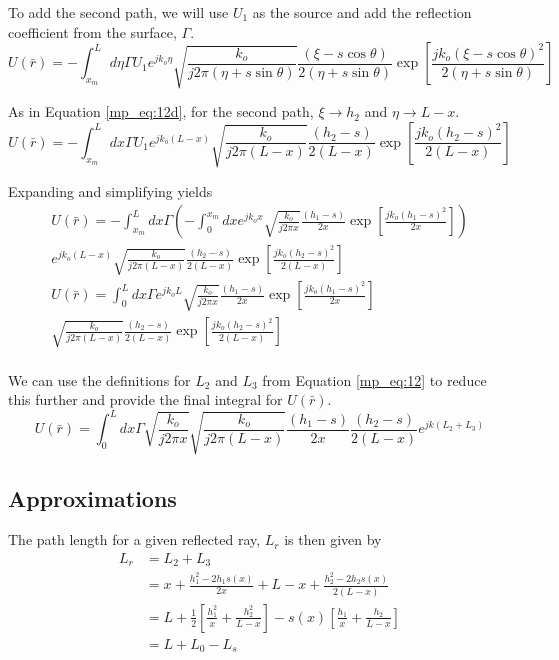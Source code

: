 To add the second path, we will use $U_1$ as the source and add the reflection coefficient from the surface, $\Gamma$.
\begin{equation}
U(\bar{r}) =  -\int_{x_m}^L d\eta \Gamma U_1e^{jk_o\eta} \sqrt{\frac{k_o}{j2\pi(\eta+s\sin\theta)}}\frac{(\xi-s\cos\theta)}{2(\eta+s\sin\theta)}\exp\left[\frac{jk_o(\xi-s\cos\theta)^2}{2(\eta+s\sin\theta)}\right]
\label{mp_eq:12e}
\end{equation}

As in Equation \ref{mp_eq:12d}, for the second path, $\xi \rightarrow h_2$ and $\eta\rightarrow L-x$.
\begin{equation}
U(\bar{r}) =  -\int_{x_m}^L dx \Gamma U_1 e^{jk_o(L-x)}\sqrt{\frac{k_o}{j2\pi(L-x)}}\frac{(h_2-s)}{2(L-x)}\exp\left[\frac{jk_o(h_2-s)^2}{2(L-x)}\right]
\label{mp_eq:12e}
\end{equation}

Expanding and simplifying yields
\begin{equation}
\begin{gathered}
U(\bar{r}) =  -\int_{x_m}^L dx \Gamma\left(-\int_{0} ^{x_m} dx e^{jk_ox} \sqrt{\frac{k_o}{j2\pi x}}\frac{(h_1-s)}{2x}\exp\left[\frac{jk_o(h_1-s)^2}{2x}\right]\right)  \\e^{jk_o(L-x)}\sqrt{\frac{k_o}{j2\pi(L-x)}}\frac{(h_2-s)}{2(L-x)}\exp\left[\frac{jk_o(h_2-s)^2}{2(L-x)}\right]\\
U(\bar{r}) =  \int_{0}^L dx \Gamma e^{jk_oL} \sqrt{\frac{k_o}{j2\pi x}}\frac{(h_1-s)}{2x}\exp\left[\frac{jk_o(h_1-s)^2}{2x}\right]  \\\sqrt{\frac{k_o}{j2\pi(L-x)}}\frac{(h_2-s)}{2(L-x)}\exp\left[\frac{jk_o(h_2-s)^2}{2(L-x)}\right]\\
\end{gathered}
\label{mp_eq:12f}
\end{equation}

We can use the definitions for $L_2$ and $L_3$ from Equation \ref{mp_eq:12} to reduce this further and provide the final integral for $U(\bar{r})$.
\begin{equation}
\boxed{U(\bar{r}) =  \int_{0}^L dx \Gamma \sqrt{\frac{k_o}{j2\pi x}}\sqrt{\frac{k_o}{j2\pi(L-x)}}\frac{(h_1-s)}{2x}\frac{(h_2-s)}{2(L-x)}e^{jk(L_2+L_3)}}
\label{mp_eq:12g}
\end{equation}

\subsection{Approximations}
The path length for a given reflected ray, $L_r$ is then given by
\begin{equation}
\begin{aligned}
L_r &= L_2 + L_3 \\
& = x + \frac{h_1^2-2h_1s(x)}{2x} +  L-x + \frac{h_2^2 - 2h_2s(x)}{2\left(L-x\right)} \\
& = L + \frac{1}{2}\left[\frac{h_1^2}{x} + \frac{h_2^2}{L-x} \right] - s(x)\left[ \frac{h_1}{x} + \frac{h_2}{L-x}\right] \\
&= L + L_0 - L_s
\end{aligned}
\label{mp_eq:13}
\end{equation}
\renewcommand{\baselinestretch}{2} \small\normalsize

